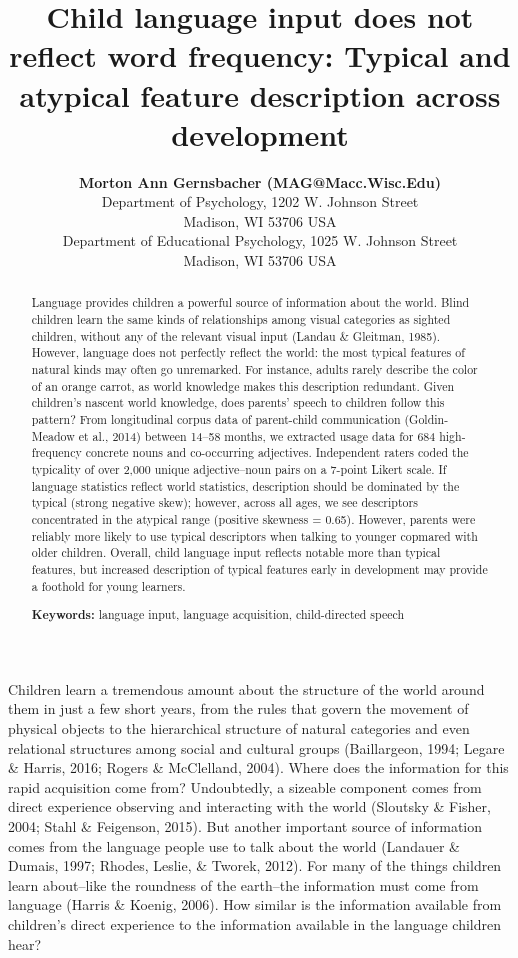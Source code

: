 \documentclass[10pt, letterpaper]{article}
\title{Child language input does not reflect word frequency: Typical and
atypical feature description across development}
\author{{\large \bf Morton Ann Gernsbacher (MAG@Macc.Wisc.Edu)} \\ Department of Psychology, 1202 W. Johnson Street \\ Madison, WI 53706 USA \AND {\large \bf Sharon J.~Derry (SDJ@Macc.Wisc.Edu)} \\ Department of Educational Psychology, 1025 W. Johnson Street \\ Madison, WI 53706 USA}
\begin{document}
\maketitle

\begin{abstract}
Language provides children a powerful source of information about the
world. Blind children learn the same kinds of relationships among visual
categories as sighted children, without any of the relevant visual input
(Landau \& Gleitman, 1985). However, language does not perfectly reflect
the world: the most typical features of natural kinds may often go
unremarked. For instance, adults rarely describe the color of an orange
carrot, as world knowledge makes this description redundant. Given
children's nascent world knowledge, does parents' speech to children
follow this pattern? From longitudinal corpus data of parent-child
communication (Goldin-Meadow et al., 2014) between 14--58 months, we
extracted usage data for 684 high-frequency concrete nouns and
co-occurring adjectives. Independent raters coded the typicality of over
2,000 unique adjective--noun pairs on a 7-point Likert scale. If
language statistics reflect world statistics, description should be
dominated by the typical (strong negative skew); however, across all
ages, we see descriptors concentrated in the atypical range (positive
skewness = 0.65). However, parents were reliably more likely to use
typical descriptors when talking to younger copmared with older
children. Overall, child language input reflects notable more than
typical features, but increased description of typical features early in
development may provide a foothold for young learners.

\textbf{Keywords:}
language input, language acquisition, child-directed speech
\end{abstract}

Children learn a tremendous amount about the structure of the world
around them in just a few short years, from the rules that govern the
movement of physical objects to the hierarchical structure of natural
categories and even relational structures among social and cultural
groups (Baillargeon, 1994; Legare \& Harris, 2016; Rogers \& McClelland,
2004). Where does the information for this rapid acquisition come from?
Undoubtedly, a sizeable component comes from direct experience observing
and interacting with the world (Sloutsky \& Fisher, 2004; Stahl \&
Feigenson, 2015). But another important source of information comes from
the language people use to talk about the world (Landauer \& Dumais,
1997; Rhodes, Leslie, \& Tworek, 2012). For many of the things children
learn about--like the roundness of the earth--the information must come
from language (Harris \& Koenig, 2006). How similar is the information
available from children's direct experience to the information available
in the language children hear?
\end{document}
